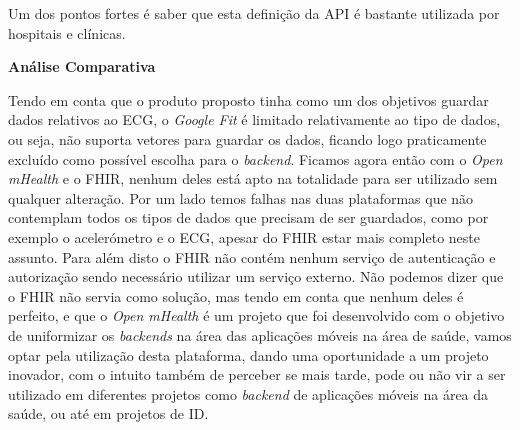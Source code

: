\par
Um dos pontos fortes é saber que esta definição da \gls{API} é bastante utilizada por hospitais e clínicas.
\par
\textbf{Análise Comparativa}
\par
Tendo em conta que o produto proposto tinha como um dos objetivos guardar dados relativos ao \gls{ECG}, o \textit{Google Fit} é limitado relativamente ao tipo de dados, ou seja, não suporta vetores para guardar os dados, ficando logo praticamente excluído como possível escolha para o \textit{backend}.
Ficamos agora então com o \textit{Open mHealth} e o \gls{FHIR}, nenhum deles está apto na totalidade para ser utilizado sem qualquer alteração. Por um lado temos falhas nas duas plataformas que não contemplam todos os tipos de dados que precisam de ser guardados, como por exemplo o acelerómetro e o \gls{ECG}, apesar do \gls{FHIR} estar mais completo neste assunto.
Para além disto o \gls{FHIR} não contém nenhum serviço de autenticação e autorização sendo necessário utilizar um serviço externo.
Não podemos dizer que o \gls{FHIR} não servia como solução, mas tendo em conta que nenhum deles é perfeito, e que o \textit{Open mHealth} é um projeto que foi desenvolvido com o objetivo de uniformizar os \textit{backends} na área das aplicações móveis na área de saúde, vamos optar pela utilização desta plataforma, dando uma oportunidade a um projeto inovador, com o intuito também de perceber se mais tarde, pode ou não vir a ser utilizado em diferentes projetos como \textit{backend} de aplicações móveis na área da saúde, ou até em projetos de \gls{ID}.

\cleardoublepage